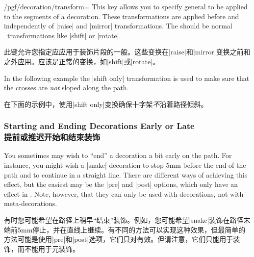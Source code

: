 \begin{key}{/pgf/decoration/transform=}
    This key allows you to specify general  to be applied
    to the segments of a decoration. These transformations are applied before
    and independently of |raise| and |mirror| transformations. The
     should be normal \tikzname\ transformations like
    |shift| or |rotate|.

    此键允许您指定应应用于装饰片段的一般。这些变换在|raise|和|mirror|变换之前和之外应用。应该是正常的\tikzname 变换，如|shift|或|rotate|。

    In the following example the |shift only| transformation is used to make
    sure that the crosses are \emph{not} sloped along the path.

    在下面的示例中，使用|shift only|变换确保十字架\emph{不}沿着路径倾斜。
\begin{codeexample}[preamble={\usetikzlibrary{decorations.shapes}}]
\end{codeexample}
\end{key}


\subsubsection{Starting and Ending Decorations Early or Late\\提前或推迟开始和结束装饰}

You sometimes may wish to ``end'' a decoration a bit early on the path. For
instance, you might wish a |snake| decoration to stop 5mm before the end of the
path and to continue in a straight line. There are different ways of achieving
this effect, but the easiest may be the |pre| and |post| options, which only
have an effect in \tikzname. Note, however, that they can only be used with
decorations, not with meta-decorations.

有时您可能希望在路径上稍早“结束”装饰。例如，您可能希望|snake|装饰在路径末端前5mm停止，并在直线上继续。有不同的方法可以实现这种效果，但最简单的方法可能是使用|pre|和|post|选项，它们只对\tikzname 有效。但请注意，它们只能用于装饰，而不能用于元装饰。

